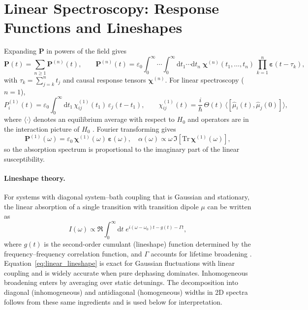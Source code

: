 \section{Linear Spectroscopy: Response Functions and Lineshapes}
\label{copy:sec:linear}
\noindent
Expanding $\boldsymbol{P}$ in powers of the field gives
\begin{equation}
    \boldsymbol{P}(t)=\sum_{n\ge 1}\boldsymbol{P}^{(n)}(t),\qquad
    \boldsymbol{P}^{(n)}(t)=\varepsilon_0\int_0^\infty\!\!\cdots\!\int_0^\infty\!\!\mathrm{d}t_1\cdots\mathrm{d}t_n\;
    \boldsymbol{\chi}^{(n)}(t_1,\ldots,t_n)\,\prod_{k=1}^n \boldsymbol{\varepsilon}(t-\tau_k),
\end{equation}
with $\tau_k=\sum_{j=k}^n t_j$ and causal response tensors $\boldsymbol{\chi}^{(n)}$. For linear spectroscopy ($n=1$),
\begin{equation}
    P_i^{(1)}(t)=\varepsilon_0\int_0^\infty \mathrm{d}t_1\, \chi^{(1)}_{ij}(t_1)\,\varepsilon_j(t-t_1),
    \qquad
    \chi^{(1)}_{ij}(t)=\frac{i}{\hbar}\,\Theta(t)\,\langle[\hat{\mu}_i(t),\hat{\mu}_j(0)]\rangle,
    \label{copy:eq:chi1_comm}
\end{equation}
where $\langle\cdot\rangle$ denotes an equilibrium average with respect to $H_0$ and operators are in the interaction picture of $H_0$ \cite{mukamel1995principlesnonlinearoptical}. Fourier transforming gives
\begin{equation}
    \boldsymbol{P}^{(1)}(\omega)=\varepsilon_0\,\boldsymbol{\chi}^{(1)}(\omega)\,\boldsymbol{\varepsilon}(\omega),\quad
    \alpha(\omega)\propto \omega\,\Im\!\left[\mathrm{Tr}\,\boldsymbol{\chi}^{(1)}(\omega)\right],
\end{equation}
so the absorption spectrum is proportional to the imaginary part of the linear susceptibility.

\paragraph{Lineshape theory.}
For systems with diagonal system--bath coupling that is Gaussian and stationary, the linear absorption of a single transition with transition dipole $\mu$ can be written as
\begin{equation}
    I(\omega)\propto \Re\int_0^\infty \mathrm{d}t\; e^{i(\omega-\omega_0)t-g(t)-\Gamma t},
    \label{copy:eq:linear_lineshape}
\end{equation}
where $g(t)$ is the second-order cumulant (lineshape) function determined by the frequency--frequency correlation function, and $\Gamma$ accounts for lifetime broadening \cite{mukamel1995principlesnonlinearoptical, hamm2005principlesnonlinearoptical}. Equation~\eqref{eq:linear_lineshape} is exact for Gaussian fluctuations with linear coupling and is widely accurate when pure dephasing dominates. Inhomogeneous broadening enters by averaging over static detunings. The decomposition into diagonal (inhomogeneous) and antidiagonal (homogeneous) widths in 2D spectra follows from these same ingredients and is used below for interpretation.

